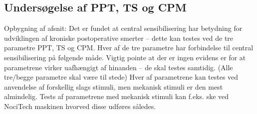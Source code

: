 \subsection{Undersøgelse af PPT, TS og CPM}

Opbygning af afsnit:
Det er fundet at central sensibilisering har betydning for udviklingen af kroniske postoperative smerter – dette kan testes ved de tre parametre PPT, TS og CPM. Hver af de tre parametre har forbindelse til central sensibilisering på følgende måde. 
Vigtig pointe at der er ingen evidens er for at parametrene virker uafhængigt af hinanden – de skal testes samtidig. (Alle tre/begge parametre skal være til stede) 
Hver af parametrene kan testes ved anvendelse af forskellig slags stimuli, men mekanisk stimuli er den mest almindelig. Tests af parametrene med mekanisk stimuli kan f.eks. ske ved NociTech maskinen hvorved disse udføres således. 
   
